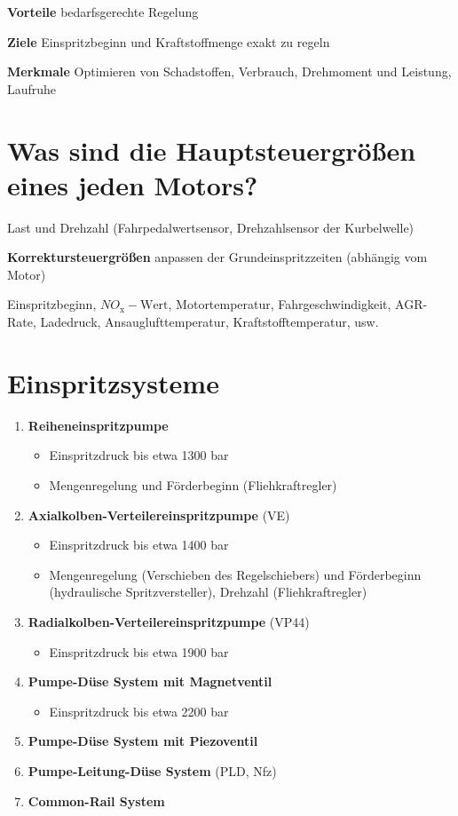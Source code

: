 \textbf{Vorteile} bedarfsgerechte Regelung

\textbf{Ziele} Einspritzbeginn und Kraftstoffmenge exakt zu regeln

\textbf{Merkmale} Optimieren von Schadstoffen, Verbrauch, Drehmoment und
Leistung, Laufruhe

\section{Was sind die Hauptsteuergrößen eines jeden
Motors?}\label{was-sind-die-hauptsteuergroessen-eines-jeden-motors}

Last und Drehzahl (Fahrpedalwertsensor, Drehzahlsensor der Kurbelwelle)

\textbf{Korrektursteuergrößen} anpassen der Grundeinspritzzeiten
(abhängig vom Motor)

Einspritzbeginn, $NO_\text{x}-\text{Wert}$, Motortemperatur,
Fahrgeschwindigkeit, AGR-Rate, Ladedruck, Ansauglufttemperatur,
Kraftstofftemperatur, usw.

\section{Einspritzsysteme}\label{einspritzsysteme}

\begin{enumerate}
\item
  \textbf{Reiheneinspritzpumpe}

  \begin{itemize}
  \item
    Einspritzdruck bis etwa 1300 bar
  \item
    Mengenregelung und Förderbeginn (Fliehkraftregler)
  \end{itemize}
\item
  \textbf{Axialkolben-Verteilereinspritzpumpe} (VE)

  \begin{itemize}
  \item
    Einspritzdruck bis etwa 1400 bar
  \item
    Mengenregelung (Verschieben des Regelschiebers) und Förderbeginn
    (hydraulische Spritzversteller), Drehzahl (Fliehkraftregler)
  \end{itemize}
\item
  \textbf{Radialkolben-Verteilereinspritzpumpe} (VP44)

  \begin{itemize}
  \item
    Einspritzdruck bis etwa 1900 bar
  \end{itemize}
\item
  \textbf{Pumpe-Düse System mit Magnetventil}

  \begin{itemize}
  \item
    Einspritzdruck bis etwa 2200 bar
  \end{itemize}
\item
  \textbf{Pumpe-Düse System mit Piezoventil}
\item
  \textbf{Pumpe-Leitung-Düse System} (PLD, Nfz)
\item
  \textbf{Common-Rail System}
\end{enumerate}

